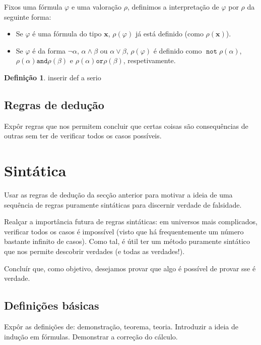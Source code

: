 \documentclass{report}
\theoremstyle{definition}
\newtheorem{definicao}{Definição}
\theoremstyle{remark}
\renewcommand{\bf}[1]{\mathbf{#1}}
\DeclareMathOperator{\pnot}{\texttt{not}}
\newcommand{\pand}{\mathbin{\texttt{and}}}
\newcommand{\por}{\mathbin{\texttt{or}}}
\begin{document}
	Fixos uma fórmula $\varphi$ e uma valoração $\rho$, definimos a interpretação de $\varphi$ por $\rho$ da seguinte forma:
	
	\begin{itemize}
	\item Se $\varphi$ é uma fórmula do tipo $\bf x$, $\rho(\varphi)$ já está definido (como $\rho(\bf x)$).
	
	\item Se $\varphi$ é da forma $\neg \alpha$, $\alpha \land \beta$ ou $\alpha \lor \beta$, $\rho(\varphi)$ é definido como $\pnot \rho(\alpha)$, $\rho(\alpha) \pand \rho(\beta)$ e $\rho(\alpha) \por \rho(\beta)$, respetivamente.
	\end{itemize}
	
	\pagebreak
	
	\begin{definicao}\label{def:formulaproposicional}
	inserir def a serio
	\end{definicao}
	
	\subsection{Regras de dedução}
	
	Expôr regras que nos permitem concluir que certas coisas são consequências de outras sem ter de verificar todos os casos possíveis.
	
	\section{Sintática}
	
	Usar as regras de dedução da secção anterior para motivar a ideia de uma sequência de regras puramente sintáticas para discernir verdade de falsidade.
	
	Realçar a importância futura de regras sintáticas: em universos mais complicados, verificar todos os casos é impossível (visto que há frequentemente um número bastante infinito de casos). Como tal, é útil ter um método puramente sintático que nos permite descobrir verdades (e todas as verdades!).
	
	Concluír que, como objetivo, desejamos provar que algo é possível de provar sse é verdade.
	
	\subsection{Definições básicas}
	
	Expôr as definições de: demonstração, teorema, teoria. Introduzir a ideia de indução em fórmulas. Demonstrar a correção do cálculo.
	
\end{document}
